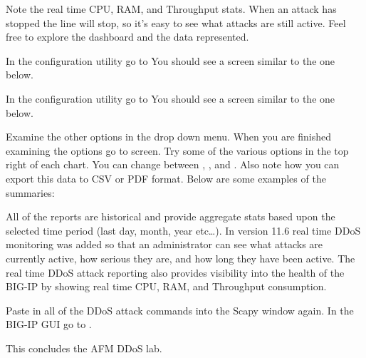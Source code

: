 \documentclass[letterpaper,10pt,english]{sphinxmanual}
\begin{document}
Note the real time CPU, RAM, and Throughput stats. When an attack has
stopped the line will stop, so it’s easy to see what attacks are still
active. Feel free to explore the dashboard and the data represented.

In the configuration utility go to  You should see a screen similar to the one below.


In the configuration utility go to  You should see a screen similar to the one below.


Examine the other options in the  drop down menu. When you
are finished examining the options go to  screen. Try some of the various options in the top right of
each chart. You can change between , ,
 and . Also note how you can export this
data to CSV or PDF format. Below are some examples of the summaries:


All of the reports are historical and provide aggregate stats based upon
the selected time period (last day, month, year etc…). In version 11.6
real time DDoS monitoring was added so that an administrator can see
what attacks are currently active, how serious they are, and how long
they have been active. The real time DDoS attack reporting also provides
visibility into the health of the BIG-IP by showing real time CPU, RAM,
and Throughput consumption.

Paste in all of the DDoS attack commands into the Scapy window again. In
the BIG-IP GUI go to .

This concludes the AFM DDoS lab.

\end{document}

